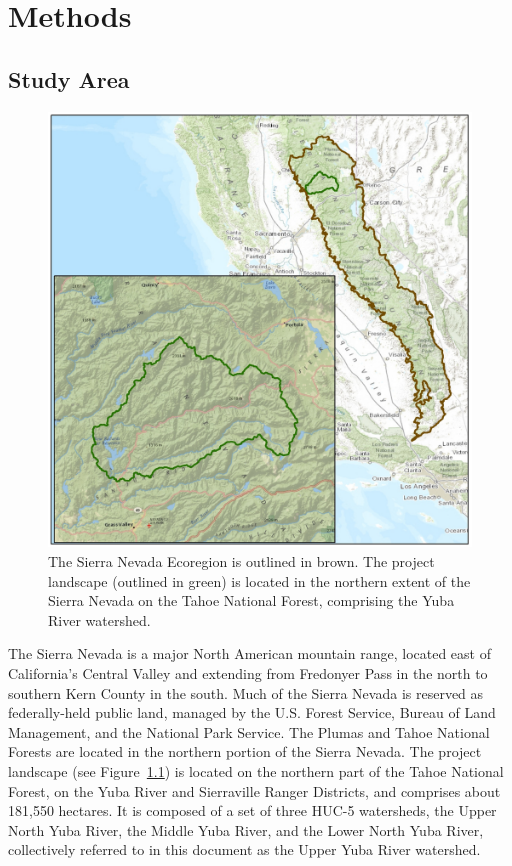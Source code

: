\chapter{Methods}
\section{Study Area}
\label{sec:studyarea}

\begin{figure}
\includegraphics[width=\textwidth]{images/ecoregionprojectarea.jpg}
\caption{The Sierra Nevada Ecoregion is outlined in brown. The project landscape (outlined in green) is located in the northern extent of the Sierra Nevada on the Tahoe National Forest, comprising the Yuba River watershed.}
\label{projectarea}
\end{figure}

The Sierra Nevada is a major North American mountain range, located east of California's Central Valley and extending from Fredonyer Pass in the north to southern Kern County in the south. Much of the Sierra Nevada is reserved as federally-held public land, managed by the U.S. Forest Service, Bureau of Land Management, and the National Park Service. The Plumas and Tahoe National Forests are located in the northern portion of the Sierra Nevada. The project landscape (see Figure~\ref{projectarea}) is located on the northern part of the Tahoe National Forest, on the Yuba River and Sierraville Ranger Districts, and comprises about 181,550 hectares. It is composed of a set of three HUC-5 watersheds, the Upper North Yuba River, the Middle Yuba River, and the Lower North Yuba River, collectively referred to in this document as the Upper Yuba River watershed. 

